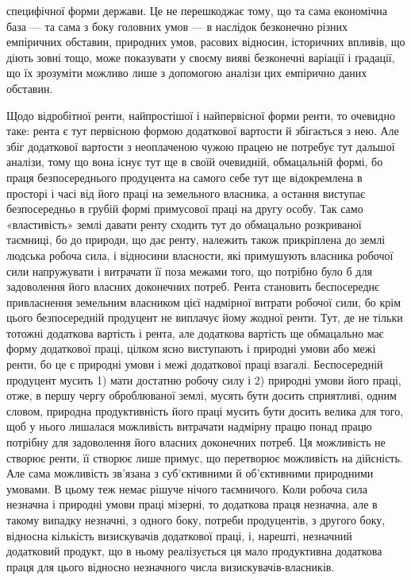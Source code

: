 \parcont{}  %
специфічної форми держави. Це не перешкоджає тому, що та сама економічна
база — та сама з боку головних умов — в наслідок безконечно різних емпіричних
обставин, природних умов, расових відносин, історичних впливів, що діють
зовні тощо, може показувати у своєму вияві безконечні варіації і ґрадації, що
їх зрозуміти можливо лише з допомогою аналізи цих емпірично даних обставин.

Щодо відробітної ренти, найпростішої і найпервісної форми ренти, то очевидно
таке: рента є тут первісною формою додаткової вартости й збігається з
нею. Але збіг додаткової вартости з неоплаченою чужою працею не потребує
тут дальшої аналізи, тому що вона існує тут ще в своїй очевидній, обмацальній
формі, бо праця безпосереднього продуцента на самого себе тут ще відокремлена
в просторі і часі від його праці на земельного власника, а остання виступає
безпосередньо в грубій формі примусової праці на другу особу. Так само «властивість»
землі давати ренту сходить тут до обмацально розкриваної таємниці, бо до
природи, що дає ренту, належить також прикріплена до землі людська робоча сила,
і відносини власности, які примушують власника робочої сили напружувати і витрачати
її поза межами того, що потрібно було б для задоволення його власних
доконечних потреб. Рента становить беспосереднє привласнення земельним
власником цієї надмірної витрати робочої сили, бо крім цього безпосередній
продуцент не виплачує йому жодної ренти. Тут, де не тільки тотожні додаткова
вартість і рента, але додаткова вартість ще обмацально має форму додаткової праці,
цілком ясно виступають і природні умови або межі ренти, бо це є природні
умови і межі додаткової праці взагалі. Беспосередній продуцент
мусить 1) мати достатню робочу силу і 2) природні умови його праці, отже,
в першу чергу оброблюваної землі, мусять бути досить сприятливі, одним
словом, природна продуктивність його праці мусить бути досить велика для
того, щоб у нього лишалася можливість витрачати надмірну працю понад працю
потрібну для задоволення його власних доконечних потреб. Ця можливість не
створює ренти, її створює лише примус, що перетворює можливість на дійсність.
Але сама можливість зв’язана з суб’єктивними й об’єктивними природними
умовами. В цьому теж немає рішуче нічого таємничого. Коли робоча сила незначна
і природні умови праці мізерні, то додаткова праця незначна, але в
такому випадку незначні, з одного боку, потреби продуцентів, з другого боку,
відносна кількість визискувачів додаткової праці, і, нарешті, незначний додатковий
продукт, що в ньому реалізується ця мало продуктивна додаткова праця для
цього відносно незначного числа визискувачів-власників.

